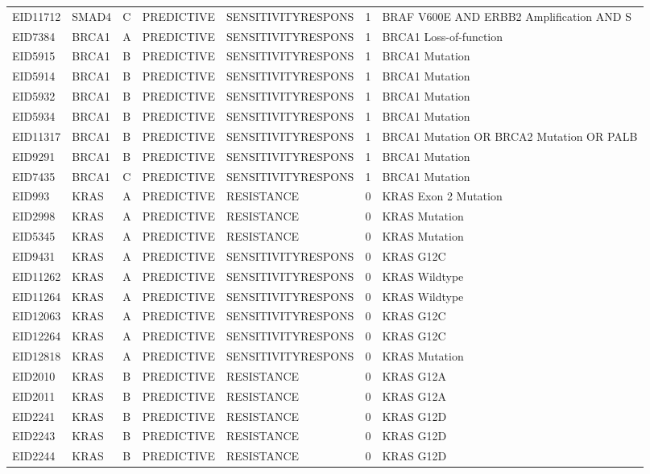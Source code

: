 \begin{footnotesize}
\begin{longtable}{llllllp{4.2cm}}
EID11712 & SMAD4 & C & PREDICTIVE & SENSITIVITYRESPONS & 1 & BRAF V600E AND ERBB2 Amplification AND S \\
EID7384 & BRCA1 & A & PREDICTIVE & SENSITIVITYRESPONS & 1 & BRCA1 Loss-of-function \\
EID5915 & BRCA1 & B & PREDICTIVE & SENSITIVITYRESPONS & 1 & BRCA1 Mutation \\
EID5914 & BRCA1 & B & PREDICTIVE & SENSITIVITYRESPONS & 1 & BRCA1 Mutation \\
EID5932 & BRCA1 & B & PREDICTIVE & SENSITIVITYRESPONS & 1 & BRCA1 Mutation \\
EID5934 & BRCA1 & B & PREDICTIVE & SENSITIVITYRESPONS & 1 & BRCA1 Mutation \\
EID11317 & BRCA1 & B & PREDICTIVE & SENSITIVITYRESPONS & 1 & BRCA1 Mutation OR BRCA2 Mutation OR PALB \\
EID9291 & BRCA1 & B & PREDICTIVE & SENSITIVITYRESPONS & 1 & BRCA1 Mutation \\
EID7435 & BRCA1 & C & PREDICTIVE & SENSITIVITYRESPONS & 1 & BRCA1 Mutation \\
EID993 & KRAS & A & PREDICTIVE & RESISTANCE & 0 & KRAS Exon 2 Mutation \\
EID2998 & KRAS & A & PREDICTIVE & RESISTANCE & 0 & KRAS Mutation \\
EID5345 & KRAS & A & PREDICTIVE & RESISTANCE & 0 & KRAS Mutation \\
EID9431 & KRAS & A & PREDICTIVE & SENSITIVITYRESPONS & 0 & KRAS G12C \\
EID11262 & KRAS & A & PREDICTIVE & SENSITIVITYRESPONS & 0 & KRAS Wildtype \\
EID11264 & KRAS & A & PREDICTIVE & SENSITIVITYRESPONS & 0 & KRAS Wildtype \\
EID12063 & KRAS & A & PREDICTIVE & SENSITIVITYRESPONS & 0 & KRAS G12C \\
EID12264 & KRAS & A & PREDICTIVE & SENSITIVITYRESPONS & 0 & KRAS G12C \\
EID12818 & KRAS & A & PREDICTIVE & SENSITIVITYRESPONS & 0 & KRAS Mutation \\
EID2010 & KRAS & B & PREDICTIVE & RESISTANCE & 0 & KRAS G12A \\
EID2011 & KRAS & B & PREDICTIVE & RESISTANCE & 0 & KRAS G12A \\
EID2241 & KRAS & B & PREDICTIVE & RESISTANCE & 0 & KRAS G12D \\
EID2243 & KRAS & B & PREDICTIVE & RESISTANCE & 0 & KRAS G12D \\
EID2244 & KRAS & B & PREDICTIVE & RESISTANCE & 0 & KRAS G12D \\

\end{longtable}
\end{footnotesize}
